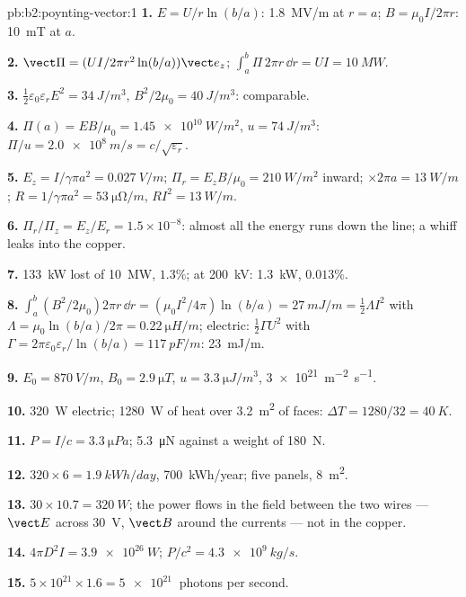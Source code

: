 \begin{solution}{pb:b2:poynting-vector:1}
\textbf{1.} $E = U/r\ln(b/a)$: \qty{1.8}{MV/m} at $r = a$; $B = \mu_0I/2\pi r$:
\qty{10}{mT} at $a$.

\textbf{2.} $\vect\Pi = (UI/2\pi r^2\ln(b/a))\vect e_z$; $\int_a^b\Pi\,2\pi r\,\dd r = UI =
\qty{10}{MW}$.

\textbf{3.} $\tfrac12\varepsilon_0\varepsilon_rE^2 = \qty{34}{J/m^3}$, $B^2/2\mu_0 = \qty{40}{J/m^3}$:
comparable.

\textbf{4.} $\Pi(a) = EB/\mu_0 = \qty{1.45e10}{W/m^2}$, $u = \qty{74}{J/m^3}$: $\Pi/u =
\qty{2.0e8}{m/s} = c/\sqrt{\varepsilon_r}$.

\textbf{5.} $E_z = I/\gamma\pi a^2 = \qty{0.027}{V/m}$; $\Pi_r = E_zB/\mu_0 = \qty{210}{W/m^2}$
inward; $\times2\pi a = \qty{13}{W/m}$; $R = 1/\gamma\pi a^2 = \qty{53}{\micro\ohm/m}$, $RI^2 =
\qty{13}{W/m}$.

\textbf{6.} $\Pi_r/\Pi_z = E_z/E_r = 1.5 \times 10^{-8}$: almost all the energy runs
down the line; a whiff leaks into the copper.

\textbf{7.} \qty{133}{kW} lost of \qty{10}{MW}, $1.3\%$; at \qty{200}{kV}: \qty{1.3}{kW},
$0.013\%$.

\textbf{8.} $\int_a^b(B^2/2\mu_0)2\pi r\,\dd r = (\mu_0I^2/4\pi)\ln(b/a) = \qty{27}{mJ/m} =
\tfrac12\Lambda I^2$ with $\Lambda = \mu_0\ln(b/a)/2\pi = \qty{0.22}{\micro H/m}$; electric:
$\tfrac12\Gamma U^2$ with $\Gamma = 2\pi\varepsilon_0\varepsilon_r/\ln(b/a) = \qty{117}{pF/m}$: \qty{23}{mJ/m}.

\textbf{9.} $E_0 = \qty{870}{V/m}$, $B_0 = \qty{2.9}{\micro T}$, $u = \qty{3.3}{\micro J/m^3}$,
\qty{3e21}{m^{-2}.s^{-1}}.

\textbf{10.} \qty{320}{W} electric; \qty{1280}{W} of heat over \qty{3.2}{m^2} of
faces: $\Delta T = 1280/32 = \qty{40}{K}$.

\textbf{11.} $P = I/c = \qty{3.3}{\micro Pa}$; \qty{5.3}{\micro N} against a weight of
\qty{180}{N}.

\textbf{12.} $320 \times 6 = \qty{1.9}{kWh/day}$, \qty{700}{kWh/year}; five panels,
\qty{8}{m^2}.

\textbf{13.} $30 \times 10.7 = \qty{320}{W}$; the power flows in the field between
the two wires --- $\vect E$ across \qty{30}{V}, $\vect B$ around the currents ---
not in the copper.

\textbf{14.} $4\pi D^2I = \qty{3.9e26}{W}$; $P/c^2 = \qty{4.3e9}{kg/s}$.

\textbf{15.} $5 \times 10^{21} \times 1.6 = \qty{5e21}{}$ photons per second.


\end{solution}
